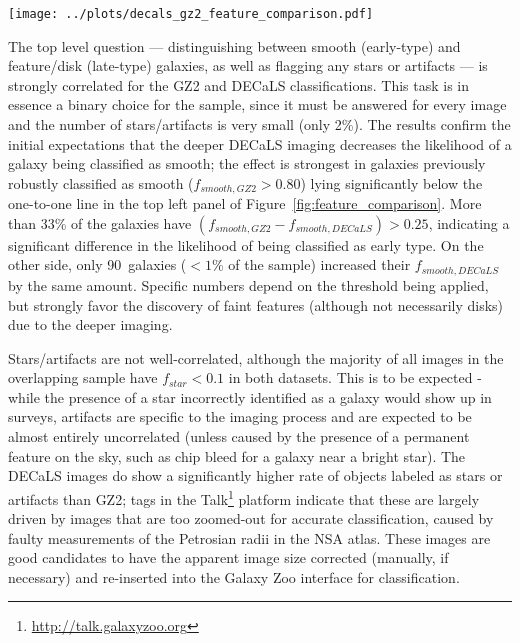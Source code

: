 \documentclass[iop,apj,tighten]{emulateapj}
\begin{document}
\begin{figure*}
\centering
\texttt{[image: ../plots/decals\_gz2\_feature\_comparison.pdf]}
\caption{Comparison of the unweighted morphological vote fractions for the 12,267~galaxies in both DECaLS (x-axis) and GZ2 (y-axis). Colors are a log-histogram of the number of galaxies in each bin, normalized to the peak bin for each category. Each morphological category plots only galaxies for which the question was well-sampled (determined by plurality vote through the decision tree). The red dashed line shows the one-to-one correspondence.\label{fig:feature_comparison}}
\end{figure*}

The top level question --- distinguishing between smooth (early-type) and feature/disk (late-type) galaxies, as well as flagging any stars or artifacts --- is strongly correlated for the GZ2 and DECaLS classifications. This task is in essence a binary choice for the sample, since it must be answered for every image and the number of stars/artifacts is very small (only 2\%). The results confirm the initial expectations that the deeper DECaLS imaging decreases the likelihood of a galaxy being classified as smooth; the effect is strongest in galaxies previously robustly classified as smooth ($f_{smooth,GZ2}>0.80$) lying significantly below the one-to-one line in the top left panel of Figure~\ref{fig:feature_comparison}. More than 33\% of the galaxies have $(f_{smooth,GZ2} - f_{smooth,DECaLS}) > 0.25$, indicating a significant difference in the likelihood of being classified as early type. On the other side, only 90~galaxies ($<1\%$ of the sample) increased their $f_{smooth,DECaLS}$ by the same amount. Specific numbers depend on the threshold being applied, but strongly favor the discovery of faint features (although not necessarily disks) due to the deeper imaging.

Stars/artifacts are not well-correlated, although the majority of all images in the overlapping sample have $f_{star}<0.1$ in both datasets. This is to be expected - while the presence of a star incorrectly identified as a galaxy would show up in surveys, artifacts are specific to the imaging process and are expected to be almost entirely uncorrelated (unless caused by the presence of a permanent feature on the sky, such as chip bleed for a galaxy near a bright star). The DECaLS images do show a significantly higher rate of objects labeled as stars or artifacts than GZ2; tags in the Talk\footnote{\url{http://talk.galaxyzoo.org}} platform indicate that these are largely driven by images that are too zoomed-out for accurate classification, caused by faulty measurements of the Petrosian radii in the NSA atlas. These images are good candidates to have the apparent image size corrected (manually, if necessary) and re-inserted into the Galaxy Zoo interface for classification. 
\end{document}
